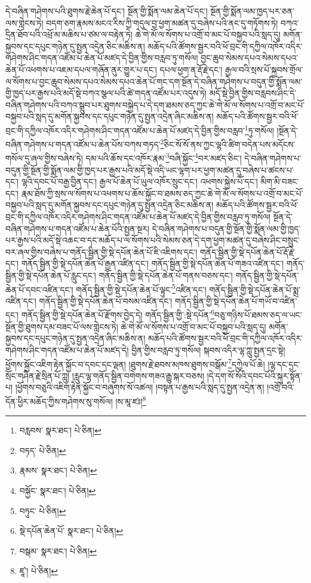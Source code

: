 དེ་བཞིན་གཤེགས་པའི་ཐུགས་རྗེ་ཆེན་པོ་དང་། སྔོན་གྱི་སྨོན་ལམ་ཆེན་པོ་དང་། སྔོན་གྱི་སྨོན་ལམ་ཁྱད་པར་ཅན་ལས་གླེངས་ཏེ། བདག་ཅག་རྣམས་མངའ་རིས་ཀྱི་གདུལ་བྱ་ཕྱག་མཚན་དུ་བཞེས་པའི་ནང་དུ་གཏོགས་ཏེ། བཀའ་དྲིན་ཐོབ་པའི་འཕྲོ་མ་མཆིས་པ་ཙམ་ལ་བརྟེན་ཏེ། ཆེ་གེ་མོ་ལ་སོགས་པ་འགྲོ་བ་མང་པོ་བསྐྱབ་པའི་སླད་དུ། མགོན་སྐྱབས་དང་དཔུང་གཉེན་དུ་སྤྱན་འདྲེན་ཅིང་མཆིས་ན། མཆོད་པའི་ཚོགས་སྦྱར་བའི་ཕོ་བྲང་གི་དཀྱིལ་འཁོར་འདིར་གཤེགས་ཤིང་གདན་འཛོམ་པ་ཆེན་པོ་མཛད་དེ་བྱིན་གྱིས་བརླབ་ཏུ་གསོལ། བྱང་ཆུབ་སེམས་དཔའ་སེམས་དཔའ་ཆེན་པོ་འཕགས་པ་འཇམ་དཔལ་གཞོན་ནུར་གྱུར་པ་དང་། དཔལ་ཕྱག་ན་རྡོ་རྗེ་དང་། རྒྱལ་བའི་སྲས་པོ་སྐྱབས་གྲོལ་ལ་སོགས་པ་བྱང་ཆུབ་སེམས་དཔའ་སེམས་དཔའ་ཆེན་པོ་གང་དག་སྔོན་དེ་བཞིན་གཤེགས་པ་བདུན་གྱི་སྨོན་ལམ་གྱི་ཁྱད་པར་རྒྱས་པའི་མདོ་སྡེ་བཀའ་སྩལ་པའི་ཚེ་གདན་འཛོམ་པར་འདུས་ཏེ། མདོ་སྡེ་བྱིན་གྱིས་བརླབས་ཤིང་དེ་བཞིན་གཤེགས་པའི་བཀའ་སྒྲུབ་པར་ཐུགས་བསྐྱེད་པ་དེ་དག་ཐམས་ཅད་ཀྱང་ཆེ་གེ་མོ་ལ་སོགས་པ་འགྲོ་བ་མང་པོ་བསྐྱབ་པའི་སླད་དུ་མགོན་སྐྱབས་དང་དཔུང་གཉེན་དུ་སྤྱན་འདྲེན་ཞིང་མཆིས་ན། མཆོད་པའི་ཚོགས་སྦྱར་བའི་ཕོ་བྲང་གི་དཀྱིལ་འཁོར་འདིར་གཤེགས་ཤིང་གདན་འཛོམ་པ་ཆེན་པོ་མཛད་དེ་བྱིན་གྱིས་བརླབ་\footnote{བརླབས་  སྣར་ཐང་།  པེ་ཅིན། }ཏུ་གསོལ། །སྔོན་དེ་བཞིན་གཤེགས་པ་གདན་འཛོམ་པ་ཆེན་པོས་བཀས་གཏད་\footnote{བཏད་  པེ་ཅིན། }ཅིང་སོ་སོ་ནས་ཀྱང་ལྷའི་ཚིག་བདེན་པས་མདོངས་གསོལ་དུ་ཞལ་གྱིས་བཞེས་ཏེ། དམ་པའི་ཆོས་དང་འཁོར་རྣམ་\footnote{རྣམས་  སྣར་ཐང་།  པེ་ཅིན། }བཞི་སྐྱོང་\footnote{བསྐྱོང་  སྣར་ཐང་།  པེ་ཅིན། }བར་མཛད་ཅིང་། དེ་བཞིན་གཤེགས་པ་བདུན་གྱི་སྔོན་གྱི་སྨོན་ལམ་གྱི་ཁྱད་པར་རྒྱས་པའི་མདོ་སྡེ་འདི་ཡང་ལྷག་པར་ཕྱག་མཚན་དུ་བཞེས་པ་ཚངས་པ་དང་། ལྷའི་དབང་པོ་བརྒྱ་བྱིན་དང་། རྒྱལ་པོ་ཆེན་པོ་ཡུལ་འཁོར་སྲུང་དང་། འཕགས་སྐྱེས་པོ་དང་། མིག་མི་བཟང་དང་། རྣམ་ཐོས་ཀྱི་སྲས་ལ་སོགས་པ་འཕགས་པ་ཆོས་སྐྱོང་བ་ཐམས་ཅད་ཀྱང་ཆེ་གེ་མོ་ལ་སོགས་པ་འགྲོ་བ་མང་པོ་བསྐྱབ་པའི་སླད་དུ་མགོན་སྐྱབས་དང་དཔུང་གཉེན་དུ་སྤྱན་འདྲེན་ཅིང་མཆིས་ན། མཆོད་པའི་ཚོགས་སྦྱར་བའི་ཕོ་བྲང་གི་དཀྱིལ་འཁོར་འདིར་གཤེགས་ཤིང་གདན་འཛོམ་པ་ཆེན་པོ་མཛད་དེ་བྱིན་གྱིས་བརླབ་ཏུ་གསོལ། སྔོན་དེ་བཞིན་གཤེགས་པ་གདན་འཛོམ་པ་ཆེན་པོའི་སྤྱན་སྔར། དེ་བཞིན་གཤེགས་པ་བདུན་གྱི་སྔོན་གྱི་སྨོན་ལམ་གྱི་ཁྱད་པར་རྒྱས་པའི་མདོ་སྡེ་འཆང་བ་དང་མཆོད་པ་ལ་སོགས་པའི་སེམས་ཅན་དེ་དག་ཕྱག་མཚན་དུ་བཞེས་ཤིང་བསྲུང་བར་ཞལ་གྱིས་བཞེས་པ་གནོད་སྦྱིན་གྱི་སྡེ་དཔོན་ཆེན་པོ་ཇི་འཇིགས་དང་། གནོད་སྦྱིན་གྱི་སྡེ་དཔོན་ཆེན་པོ་རྡོ་རྗེ་དང་། གནོད་སྦྱིན་གྱི་སྡེ་དཔོན་ཆེན་པོ་རྒྱན་འཛིན་དང་། གནོད་སྦྱིན་གྱི་སྡེ་དཔོན་ཆེན་པོ་གཟའ་འཛིན་དང་། གནོད་སྦྱིན་གྱི་སྡེ་དཔོན་ཆེན་པོ་རླུང་དང་། གནོད་སྦྱིན་གྱི་སྡེ་དཔོན་ཆེན་པོ་གནས་བཅས་དང་། གནོད་སྦྱིན་གྱི་སྡེ་དཔོན་ཆེན་པོ་དབང་འཛིན་དང་། གནོད་སྦྱིན་གྱི་སྡེ་དཔོན་ཆེན་པོ་ལྟུང་\footnote{བཏུང་  པེ་ཅིན། }འཛིན་དང་། གནོད་སྦྱིན་གྱི་སྡེ་དཔོན་ཆེན་པོ་སྨྲ་འཛིན་དང་། གནོད་སྦྱིན་གྱི་སྡེ་དཔོན་ཆེན་པོ་བསམ་འཛིན་དང་། གནོད་སྦྱིན་གྱི་སྡེ་དཔོན་ཆེན་པོ་གཡོ་བ་འཛིན་དང་། གནོད་སྦྱིན་གྱི་སྡེ་དཔོན་ཆེན་པོ་རྫོགས་བྱེད་དེ། གནོད་སྦྱིན་གྱི་:སྡེ་དཔོན་\footnote{སྡེ་དཔོན་ཆེན་པོ་  སྣར་ཐང་།  པེ་ཅིན། }བཅུ་གཉིས་པོ་ཐམས་ཅད་ལ་ཡང་སྔོན་གྱི་ཐུགས་དམ་བཟང་པོ་ལས་གླེངས་ཏེ། ཆེ་གེ་མོ་ལ་སོགས་པ་འགྲོ་བ་མང་པོ་བསྐྱབ་པའི་སླད་དུ། མགོན་སྐྱབས་དང་དཔུང་གཉེན་དུ་སྤྱན་འདྲེན་ཞིང་མཆིས་ན། མཆོད་པའི་ཚོགས་སྦྱར་བའི་ཕོ་བྲང་གི་དཀྱིལ་འཁོར་འདིར་གཤེགས་ཤིང་གདན་འཛོམ་པ་ཆེན་པོ་མཛད་དེ། བྱིན་གྱིས་བརླབ་ཏུ་གསོལ། སྐབས་འདིར་ལྷ་ཀླུ་སྤྱན་དྲང་སྟེ། ཕྱོགས་སྐྱོང་འཇིག་རྟེན་སྐྱོང་བ་དབང་དང་ལྡན། །ཐུགས་རྗེ་ཐབས་མཁས་ཐུགས་བསྒོམ་\footnote{བསྒམ་  སྣར་ཐང་།  པེ་ཅིན། }དཀྱེལ་པོ་ཆེ། །ལྷ་དང་དྲང་སྲོང་གཤིན་རྗེ་སྲིན་པོ་ཀླུ། །རླུང་ལྷ་གནོད་སྦྱིན་བགེགས་གཟའ་རྒྱུ་སྐར་བཅས། །དེ་དག་སོ་སོའི་དབང་པོའི་སྐུར་སྟོན་པ། །ཕྱོགས་བཅུའི་འཇིག་རྟེན་སྐྱོང་བ་བཞུགས་སོ་འཚལ། །བསྟན་པ་རྒྱས་པའི་སླད་དུ་སྤྱན་འདྲེན་ན། །འགྲོ་བའི་དོན་ཕྱིར་མཆོད་ཀྱིས་གཤེགས་སུ་གསོལ། །ས་མཱ་ཛཿ།\footnote{ཛཱ་།  པེ་ཅིན། } 